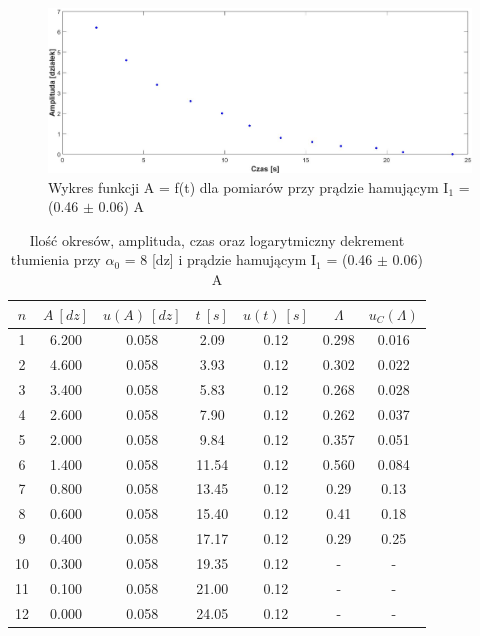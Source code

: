 \documentclass[12pt, a4paper, oneside]{article}
\begin{document}
\clearpage
\begin{figure}[h]
\centering
\caption{Wykres funkcji A = f(t) dla pomiarów przy prądzie hamującym I$_1$ = (0.46 $\pm$ 0.06) A}
\includegraphics[scale=0.3]{f2.png}
\end{figure}
\begin{table}[h]
  \centering
  \caption{Ilość okresów, amplituda, czas oraz logarytmiczny dekrement tłumienia przy $\alpha_0$ = 8 [dz] i prądzie hamującym I$_1$ = (0.46 $\pm$ 0.06) A}
    \begin{tabular}{|c|c|c|c|c|c|c|}\hline
    $n$ & $A~[dz]$ & $u(A)~[dz]$ & $t~[s]$ & \multicolumn{1}{|c|}{$u(t)~[s]$} & $\Lambda$ & $u_C(\Lambda)$ \\\hline
    1 & 6.200 & 0.058 & 2.09 & 0.12 & 0.298 & 0.016 \\\hline
    2 & 4.600 & 0.058 & 3.93 & 0.12 & 0.302 & 0.022 \\\hline
    3 & 3.400 & 0.058 & 5.83 & 0.12 & 0.268 & 0.028 \\\hline
    4 & 2.600 & 0.058 & 7.90 & 0.12 & 0.262 & 0.037 \\\hline
    5 & 2.000 & 0.058 & 9.84 & 0.12 & 0.357 & 0.051 \\\hline
    6 & 1.400 & 0.058 & 11.54 & 0.12 & 0.560 & 0.084 \\\hline
    7 & 0.800 & 0.058 & 13.45 & 0.12 & 0.29 & 0.13 \\\hline
    8 & 0.600 & 0.058 & 15.40 & 0.12 & 0.41 & 0.18 \\\hline
    9 & 0.400 & 0.058 & 17.17 & 0.12 & 0.29 & 0.25 \\\hline
    10 & 0.300 & 0.058 & 19.35 & 0.12 & - & - \\\hline
    11 & 0.100 & 0.058 & 21.00 & 0.12 & - & - \\\hline
    12 & 0.000 & 0.058 & 24.05 & 0.12 & - & - \\\hline
    \end{tabular}%
  \label{tab:addlabel}%
\end{table}%
\end{document}
